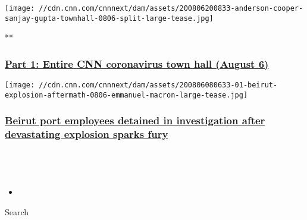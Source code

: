\texttt{[image: //cdn.cnn.com/cnnnext/dam/assets/200806200833-anderson-cooper-sanjay-gupta-townhall-0806-split-large-tease.jpg]}

**

\hypertarget{part-1-entire-cnn-coronavirus-town-hall-august-6}{%
\subsubsection{\texorpdfstring{\href{/videos/health/2020/08/06/entire-august-6-coronavirus-town-hall-part-1-sot-vpx.cnn}{Part
1: Entire CNN coronavirus town hall (August
6)}}{Part 1: Entire CNN coronavirus town hall (August 6)}}\label{part-1-entire-cnn-coronavirus-town-hall-august-6}}

\href{/2020/08/06/middleeast/beirut-explosion-anger-intl-hnk/index.html}{}

\texttt{[image: //cdn.cnn.com/cnnnext/dam/assets/200806080633-01-beirut-explosion-aftermath-0806-emmanuel-macron-large-tease.jpg]}

\hypertarget{beirut-port-employees-detained-in-investigation-after-devastating-explosion-sparks-fury-1}{%
\subsubsection{\texorpdfstring{\href{/2020/08/06/middleeast/beirut-explosion-anger-intl-hnk/index.html}{Beirut
port employees detained in investigation after devastating explosion
sparks
fury}}{Beirut port employees detained in investigation after devastating explosion sparks fury}}\label{beirut-port-employees-detained-in-investigation-after-devastating-explosion-sparks-fury-1}}

\hypertarget{-}{%
\subsection{~}\label{-}}

\begin{itemize}
\item
\end{itemize}

Search

